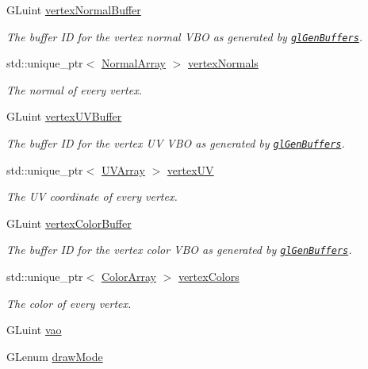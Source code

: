 \begin{DoxyCompactItemize}
G\+Luint \hyperlink{class_rendering_object_a91649e3a653f2266cd00c718f10849f9}{vertex\+Normal\+Buffer}
\begin{DoxyCompactList}\small\item\em The buffer I\+D for the vertex normal V\+B\+O as generated by \href{https://www.opengl.org/sdk/docs/man/html/glGenBuffers.xhtml}{\tt gl\+Gen\+Buffers}. \end{DoxyCompactList}\item 
std\+::unique\+\_\+ptr$<$ \hyperlink{class_rendering_object_a327c4d892de8d6138fb59afa6d078257}{Normal\+Array} $>$ \hyperlink{class_rendering_object_ac28d301f97d29ab603f65f8e823063b4}{vertex\+Normals}
\begin{DoxyCompactList}\small\item\em The normal of every vertex. \end{DoxyCompactList}\item 
G\+Luint \hyperlink{class_rendering_object_ad583c70014e3f6ab0c9b62ea3c96ad25}{vertex\+U\+V\+Buffer}
\begin{DoxyCompactList}\small\item\em The buffer I\+D for the vertex U\+V V\+B\+O as generated by \href{https://www.opengl.org/sdk/docs/man/html/glGenBuffers.xhtml}{\tt gl\+Gen\+Buffers}. \end{DoxyCompactList}\item 
std\+::unique\+\_\+ptr$<$ \hyperlink{class_rendering_object_a504ecd45ebe36dfa5b78c46d64d9904a}{U\+V\+Array} $>$ \hyperlink{class_rendering_object_afc405316bddec4ba1d5c228ecc0d9061}{vertex\+U\+V}
\begin{DoxyCompactList}\small\item\em The U\+V coordinate of every vertex. \end{DoxyCompactList}\item 
G\+Luint \hyperlink{class_rendering_object_aeb014a4ef24e2fc4665a769241660cad}{vertex\+Color\+Buffer}
\begin{DoxyCompactList}\small\item\em The buffer I\+D for the vertex color V\+B\+O as generated by \href{https://www.opengl.org/sdk/docs/man/html/glGenBuffers.xhtml}{\tt gl\+Gen\+Buffers}. \end{DoxyCompactList}\item 
std\+::unique\+\_\+ptr$<$ \hyperlink{class_rendering_object_a8a12e1f9be788d99af6c089e1c600022}{Color\+Array} $>$ \hyperlink{class_rendering_object_a65fc52e665791ce55e43106b603e917a}{vertex\+Colors}
\begin{DoxyCompactList}\small\item\em The color of every vertex. \end{DoxyCompactList}\item 
G\+Luint \hyperlink{class_rendering_object_a96dd05670a977a949514a2c490c1c867}{vao}
\item 
G\+Lenum \hyperlink{class_rendering_object_aa67856a72705b54a5667e91e270d00b3}{draw\+Mode}
\end{DoxyCompactItemize}
